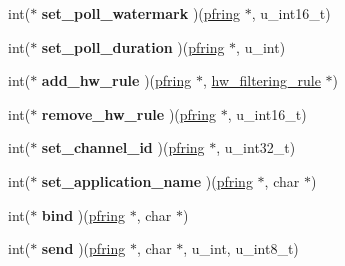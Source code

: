 \begin{DoxyCompactItemize}
\item 
\hypertarget{struct____pfring_ae5d0c066a459237ddf715a4e2273a1a9}{
int($\ast$ {\bfseries set\_\-poll\_\-watermark} )(\hyperlink{struct____pfring}{pfring} $\ast$, u\_\-int16\_\-t)}
\label{struct____pfring_ae5d0c066a459237ddf715a4e2273a1a9}

\item 
\hypertarget{struct____pfring_a78d20062229d585f66b62bb8717784cd}{
int($\ast$ {\bfseries set\_\-poll\_\-duration} )(\hyperlink{struct____pfring}{pfring} $\ast$, u\_\-int)}
\label{struct____pfring_a78d20062229d585f66b62bb8717784cd}

\item 
\hypertarget{struct____pfring_a78f767b19ae2fe1dfa101032636fdd2c}{
int($\ast$ {\bfseries add\_\-hw\_\-rule} )(\hyperlink{struct____pfring}{pfring} $\ast$, \hyperlink{structhw__filtering__rule}{hw\_\-filtering\_\-rule} $\ast$)}
\label{struct____pfring_a78f767b19ae2fe1dfa101032636fdd2c}

\item 
\hypertarget{struct____pfring_a5cacd265c18ae7116fe404fb3978a175}{
int($\ast$ {\bfseries remove\_\-hw\_\-rule} )(\hyperlink{struct____pfring}{pfring} $\ast$, u\_\-int16\_\-t)}
\label{struct____pfring_a5cacd265c18ae7116fe404fb3978a175}

\item 
\hypertarget{struct____pfring_ad52e40ca0eea8a83dbb038017523c6d4}{
int($\ast$ {\bfseries set\_\-channel\_\-id} )(\hyperlink{struct____pfring}{pfring} $\ast$, u\_\-int32\_\-t)}
\label{struct____pfring_ad52e40ca0eea8a83dbb038017523c6d4}

\item 
\hypertarget{struct____pfring_a8d13bf216487c8b88ed706f235657fca}{
int($\ast$ {\bfseries set\_\-application\_\-name} )(\hyperlink{struct____pfring}{pfring} $\ast$, char $\ast$)}
\label{struct____pfring_a8d13bf216487c8b88ed706f235657fca}

\item 
\hypertarget{struct____pfring_a4e1a47b73cde230e89e203b124f38b01}{
int($\ast$ {\bfseries bind} )(\hyperlink{struct____pfring}{pfring} $\ast$, char $\ast$)}
\label{struct____pfring_a4e1a47b73cde230e89e203b124f38b01}

\item 
\hypertarget{struct____pfring_a53578190bb59d05422d44d0a69b803e2}{
int($\ast$ {\bfseries send} )(\hyperlink{struct____pfring}{pfring} $\ast$, char $\ast$, u\_\-int, u\_\-int8\_\-t)}
\label{struct____pfring_a53578190bb59d05422d44d0a69b803e2}


\end{DoxyCompactItemize}
